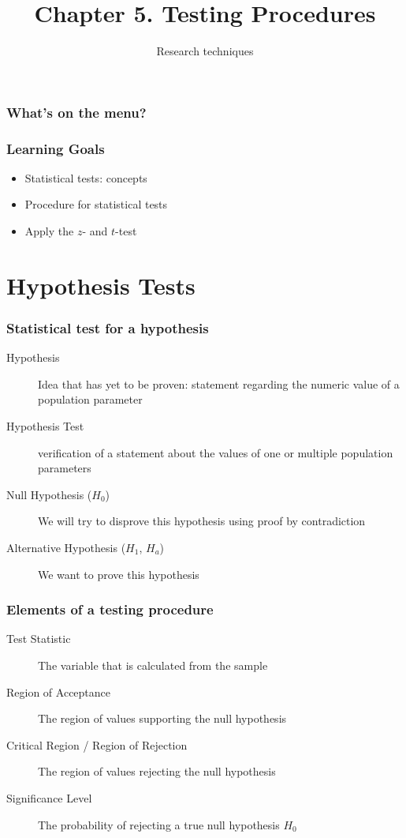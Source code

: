 \documentclass[aspectratio=169]{beamer}
\title{Chapter 5. Testing Procedures}
\subtitle{Research techniques}
\begin{document}
\begin{frame}
  \maketitle
\end{frame}

\begin{frame}
  \frametitle{What's on the menu?}
  
  \tableofcontents
\end{frame}

\begin{frame}
  \frametitle{Learning Goals}
  
  \begin{itemize}
    \item Statistical tests: concepts
    \item Procedure for statistical tests
    \item Apply the $z$- and $t$-test
  \end{itemize}
\end{frame}


\section{Hypothesis Tests}

\begin{frame}
  \frametitle{Statistical test for a hypothesis}
  
  \begin{description}
    \item[Hypothesis] Idea that has yet to be proven: statement regarding the numeric value of a population parameter
    \item[Hypothesis Test] verification of a statement about the values of one or multiple population parameters
    \item[Null Hypothesis ($H_0$)]  We will try to disprove this hypothesis using proof by contradiction
    \item[Alternative Hypothesis ($H_1$, $H_a$)] We want to prove this hypothesis
  \end{description}
\end{frame}

\begin{frame}
  \frametitle{Elements of a testing procedure}
  
  \begin{description}
    \item[Test Statistic] The variable that is calculated from the sample
    \item[Region of Acceptance] The region of values \alert{supporting} the null hypothesis
    \item[Critical Region / Region of Rejection] The region of values \alert{rejecting} the null hypothesis
    \item[Significance Level] The probability of rejecting a true null hypothesis $H_0$
  \end{description}
\end{frame}
\end{document}
